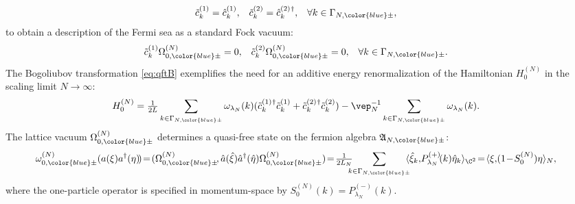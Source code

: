 \documentclass[a4paper, 11pt]{article}
\newcommand{\fA}{\mathfrak{A}}\newcommand{\cA}{\mathcal{A}}\newcommand{\dA}{\mathds{A}}\newcommand{\sA}{\mathscr{A}}
\DeclareMathOperator{\1}{\mathds{1}}
\begin{document}
\begin{align}
\label{eq:qftB}
\tilde{c}^{(1)}_{k} & = \hat{c}^{(1)}_{k}, & \tilde{c}^{(2)}_{k} & = \hat{c}^{(2)\!\!\ \dagger}_{k}, & \forall k&\in\Gamma_{N,{\color{blue}\pm}},
\end{align}
to obtain a description of the Fermi sea as a standard Fock vacuum:
\begin{align}
\label{eq:qftvac}
\tilde{c}^{(1)}_{k}\Omega^{(N)}_{0,{\color{blue}\pm}} & = 0, & \tilde{c}^{(2)}_{k}\Omega^{(N)}_{0,{\color{blue}\pm}} & = 0, & \forall k&\in\Gamma_{N,{\color{blue}\pm}}.
\end{align}
The Bogoliubov transformation \eqref{eq:qftB} exemplifies the need for an additive energy renormalization of the Hamiltonian $H^{(N)}_{0}$ in the scaling limit $N\rightarrow\infty$:
\begin{align}
\label{eq:qftH}
H^{(N)}_{0} & = \tfrac{1}{2L}\sum_{k\in\Gamma_{N,{\color{blue}\pm}}}\omega_{\lambda_{N}}(k)(\tilde{c}^{(1)\!\!\ \dagger}_{k}\tilde{c}^{(1)}_{k}+\tilde{c}^{(2)\!\!\ \dagger}_{k}\tilde{c}^{(2)}_{k}) - \vep_{N}^{-1}\sum_{k\in\Gamma_{N,{\color{blue}\pm}}}\omega_{\lambda_{N}}(k).
\end{align}
The lattice vacuum $\Omega^{(N)}_{0,{\color{blue}\pm}}$ determines a quasi-free state on the fermion algebra $\fA_{N,{\color{blue}\pm}}$:
\begin{align}
\label{eq:Fgroundstate}
\omega^{(N)}_{0,{\color{blue}\pm}}(a(\xi)a^{\dag}(\eta)\!) &\!=\!(\Omega^{(N)}_{0,{\color{blue}\pm}}\!,\hat{a}(\hat{\xi})\hat{a}^{\dag}(\hat{\eta})\Omega^{(N)}_{0,{\color{blue}\pm}})\!=\!\tfrac{1}{2 L_{N}}\!\!\!\!\sum_{k\in\Gamma_{N,{\color{blue}\pm}}}\!\!\!\langle\hat{\xi}_{k},\!P^{(+)}_{\lambda_{N}}\!(k)\hat{\eta}_{k}\rangle_{\C^{2}}\!=\!\langle\xi,\!(1\!-\!S^{(N)}_{0})\eta\rangle_{N},
\end{align}
where the one-particle operator is specified in momentum-space by $S^{(N)}_{0}(k) = P^{(-)}_{\lambda_{N}}(k)$.

\bigskip
\end{document}
